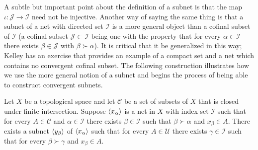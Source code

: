 A subtle but important point about the definition of a subnet is that the map $\iota : \mathcal{J} \to \mathcal{I}$ need not be injective.  Another way of saying the same thing is that a subnet of a net with directed set $\mathcal{I}$ is a more general object than a cofinal subset of $\mathcal{I}$ (a cofinal subset $\mathcal{J} \subset \mathcal{I}$ being one with the property that for every $\alpha \in \mathcal{I}$ there exists $\beta \in \mathcal{J}$ with $\beta \succ \alpha$).  It is critical that it be generalized in this way; Kelley has an exercise that provides an example of a compact set and a net which contains no convergent cofinal subset.  The following construction illustrates how we use the more general notion of a subnet and begins the process of being able to construct convergent subnets.

\begin{prop}\label{SubnetConstruction}Let $X$ be a topological space and let $\mathcal{C}$ be a set of subsets of $X$ that is closed under finite intersection.  Suppose $\langle x_{\alpha} \rangle$ is a net in $X$ with index set $\mathcal{I}$ such that for every $A \in \mathcal{C}$ and $\alpha \in \mathcal{I}$ there exists $\beta \in \mathcal{I}$ such that $\beta \succ \alpha$ and $x_\beta \in A$.  There exists a subnet $\langle y_{\beta} \rangle$ of $\langle x_{\alpha} \rangle$ such that for every $A \in \mathcal{U}$ there exists $\gamma \in \mathcal{I}$ such that for every $\beta \succ \gamma$ and $x_\beta \in A$.
\end{prop}
